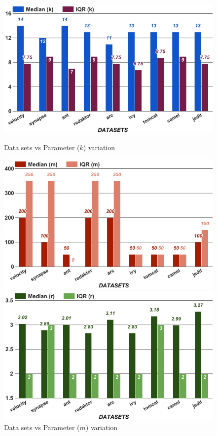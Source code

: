 \begin{figure}[!t]
    \centering
    \begin{minipage}{.33\textwidth}
        \captionsetup{justification=centering,singlelinecheck=off}
        \includegraphics[width=.95\linewidth]{./fig/k.png}
        \caption{Data sets vs Parameter ($k$) variation}
        \label{RQ3:k}
    \end{minipage}%
    \begin{minipage}{.33\textwidth}
        \captionsetup{labelsep=space,justification=centering,singlelinecheck=off}
        \includegraphics[width=.95\linewidth]{./fig/m.png}
        \caption{Data sets vs Parameter ($m$) variation}
        \label{RQ3:a}
    \end{minipage}
    \begin{minipage}{.33\textwidth}
        \captionsetup{labelsep=space,justification=centering,singlelinecheck=off}
        \includegraphics[width=.95\linewidth]{./fig/r.png}

\end{minipage}
\end{figure}
